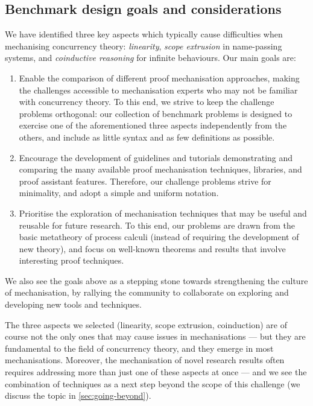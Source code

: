 \documentclass[runningheads]{llncs}
\begin{document}
\subsection*{Benchmark design goals and considerations}%

We have identified three key aspects which typically cause difficulties when
mechanising concurrency theory: \emph{linearity}, \emph{scope extrusion} in
name-passing systems, and \emph{coinductive reasoning} for infinite behaviours.
Our main goals are:

\begin{enumerate}
\item Enable the comparison of different proof mechanisation approaches, making
  the challenges accessible to mechanisation experts who may not be familiar
  with concurrency theory. To this end, we strive to keep the challenge problems
  orthogonal: our collection of benchmark problems is designed to exercise one
  of the aforementioned three aspects independently from the others, and include
  as little syntax and as few definitions as possible.

\item Encourage the development of guidelines and tutorials demonstrating and
  comparing the many available proof mechanisation techniques, libraries, and
  proof assistant features.  Therefore, our challenge problems strive for
  minimality, and adopt a simple and uniform notation.

\item Prioritise the exploration of mechanisation techniques that may be useful
  and reusable for future research. To this end, our problems are drawn from the
  basic metatheory of process calculi (instead of requiring the development of
  new theory), and focus on well-known theorems and results that involve
  interesting proof techniques.
\end{enumerate}

We also see the goals above as a stepping stone towards strengthening the
culture of mechanisation, by rallying the community to collaborate on exploring
and developing new tools and techniques.

The three aspects we selected (linearity, scope extrusion, coinduction) are of
course not the only ones that may cause issues in mechanisations --- but they
are fundamental to the field of concurrency theory, and they emerge in most
mechanisations.  Moreover, the mechanisation of novel research results often
requires addressing more than just one of these aspects at once --- and we see
the combination of techniques as a next step beyond the scope of this challenge
(we discuss the topic in \cref{sec:going-beyond}).
\end{document}
